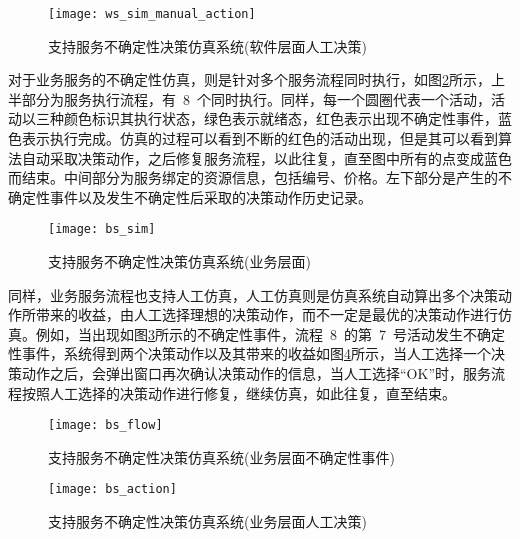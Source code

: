 \begin{figure}[htbp]
    \centering
    \texttt{[image: ws\_sim\_manual\_action]}
    \caption{支持服务不确定性决策仿真系统(软件层面人工决策)}\label{figure:ws_sim_manual_action}
    \vspace{-1em}
\end{figure}

对于业务服务的不确定性仿真，则是针对多个服务流程同时执行，如图\ref{figure:bs_sim}所示，上半部分为服务执行流程，有~8~个同时执行。同样，每一个圆圈代表一个活动，活动以三种颜色标识其执行状态，绿色表示就绪态，红色表示出现不确定性事件，蓝色表示执行完成。仿真的过程可以看到不断的红色的活动出现，但是其可以看到算法自动采取决策动作，之后修复服务流程，以此往复，直至图中所有的点变成蓝色而结束。中间部分为服务绑定的资源信息，包括编号、价格。左下部分是产生的不确定性事件以及发生不确定性后采取的决策动作历史记录。

\begin{figure}[htbp]
    \centering
    \texttt{[image: bs\_sim]}
    \caption{支持服务不确定性决策仿真系统(业务层面)}\label{figure:bs_sim}
    \vspace{-1em}
\end{figure}

同样，业务服务流程也支持人工仿真，人工仿真则是仿真系统自动算出多个决策动作所带来的收益，由人工选择理想的决策动作，而不一定是最优的决策动作进行仿真。例如，当出现如图\ref{figure:bs_flow}所示的不确定性事件，流程~8~的第~7~号活动发生不确定性事件，系统得到两个决策动作以及其带来的收益如图\ref{figure:bs_action}所示，当人工选择一个决策动作之后，会弹出窗口再次确认决策动作的信息，当人工选择“OK”时，服务流程按照人工选择的决策动作进行修复，继续仿真，如此往复，直至结束。

\begin{figure}[htbp]
    \centering
    \texttt{[image: bs\_flow]}
    \caption{支持服务不确定性决策仿真系统(业务层面不确定性事件)}\label{figure:bs_flow}
    \vspace{-1em}
\end{figure}


\begin{figure}[htbp]
    \centering
    \texttt{[image: bs\_action]}
    \caption{支持服务不确定性决策仿真系统(业务层面人工决策)}\label{figure:bs_action}
    \vspace{-1em}
\end{figure}





